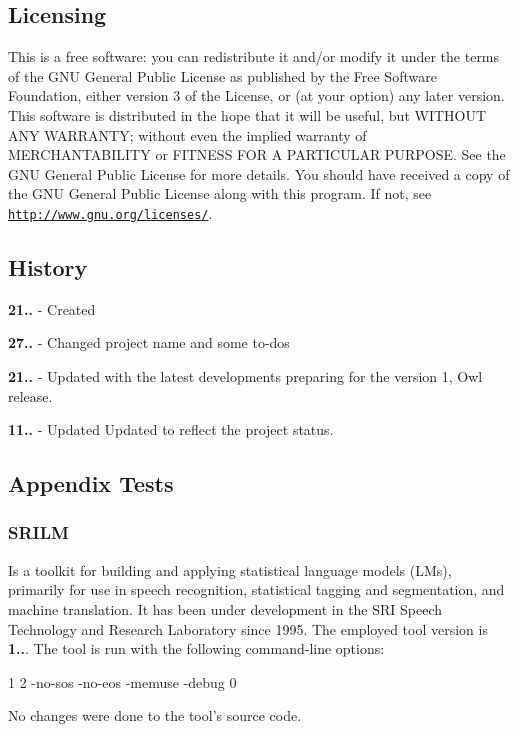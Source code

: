 \subsection*{Licensing}

This is a free software\+: you can redistribute it and/or modify it under the terms of the G\+N\+U General Public License as published by the Free Software Foundation, either version 3 of the License, or (at your option) any later version. This software is distributed in the hope that it will be useful, but W\+I\+T\+H\+O\+U\+T A\+N\+Y W\+A\+R\+R\+A\+N\+T\+Y; without even the implied warranty of M\+E\+R\+C\+H\+A\+N\+T\+A\+B\+I\+L\+I\+T\+Y or F\+I\+T\+N\+E\+S\+S F\+O\+R A P\+A\+R\+T\+I\+C\+U\+L\+A\+R P\+U\+R\+P\+O\+S\+E. See the G\+N\+U General Public License for more details. You should have received a copy of the G\+N\+U General Public License along with this program. If not, see \href{http://www.gnu.org/licenses/}{\tt http\+://www.\+gnu.\+org/licenses/}.

\subsection*{History}


\begin{DoxyItemize}
\item {\bfseries 21..} -\/ Created
\item {\bfseries 27..} -\/ Changed project name and some to-\/do\textquotesingle{}s
\item {\bfseries 21..} -\/ Updated with the latest developments preparing for the version 1, Owl release.
\item {\bfseries 11..} -\/ Updated Updated to reflect the project status.
\end{DoxyItemize}

\subsection*{Appendix Tests}

\subsubsection*{S\+R\+I\+L\+M}

Is a toolkit for building and applying statistical language models (L\+Ms), primarily for use in speech recognition, statistical tagging and segmentation, and machine translation. It has been under development in the S\+R\+I Speech Technology and Research Laboratory since 1995. The employed tool version is {\bfseries 1..}. The tool is run with the following command-\/line options\+: 
\begin{DoxyCode}
1 %
2       -no-sos -no-eos -memuse -debug 0
\end{DoxyCode}
 No changes were done to the tool’s source code.

